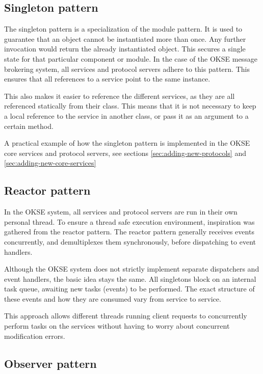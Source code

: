 \subsection{Singleton pattern}

The singleton pattern is a specialization of the module pattern. It is used to guarantee that an object cannot be instantiated more than once. Any further invocation would return the already instantiated object. This secures a single state for that particular component or module. In the case of the OKSE message brokering system, all services and protocol servers adhere to this pattern. This ensures that all references to a service point to the same instance.

This also makes it easier to reference the different services, as they are all referenced statically from their class. This means that it is not necessary to keep a local reference to the service in another class, or pass it as an argument to a certain method.

A practical example of how the singleton pattern is implemented in the OKSE core services and protocol servers, see sections \ref{sec:adding-new-protocols} and \ref{sec:adding-new-core-services}

\subsection{Reactor pattern}

In the OKSE system, all services and protocol servers are run in their own personal thread. To ensure a thread safe execution environment, inspiration was gathered from the reactor pattern. The reactor pattern generally receives events concurrently, and demultiplexes them synchronously, before dispatching to event handlers.

Although the OKSE system does not strictly implement separate dispatchers and event handlers, the basic idea stays the same. All singletons block on an internal task queue, awaiting new tasks (events) to be performed. The exact structure of these events and how they are consumed vary from service to service.

This approach allows different threads running client requests to concurrently perform tasks on the services without having to worry about concurrent modification errors.

\subsection{Observer pattern}

